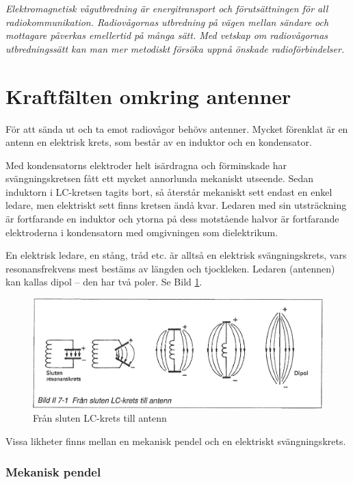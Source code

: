 \emph{Elektromagnetisk vågutbredning är energitransport och
  förutsättningen för all radiokommunikation. Radiovågornas utbredning
  på vägen mellan sändare och mottagare påverkas emellertid på många
  sätt. Med vetskap om radiovågornas utbredningssätt kan man mer
  metodiskt försöka uppnå önskade radioförbindelser.}

\section{Kraftfälten omkring antenner}

För att sända ut och ta emot radiovågor behövs antenner. Mycket
förenklat är en antenn en elektrisk krets, som består av en induktor
och en kondensator.

Med kondensatorns elektroder helt isärdragna och förminskade har
svängningskretsen fått ett mycket annorlunda mekaniskt utseende. Sedan
induktorn i LC-kretsen tagits bort, så återstår mekaniskt sett endast
en enkel ledare, men elektriskt sett finns kretsen ändå kvar. Ledaren
med sin utsträckning är fortfarande en induktor och ytorna på dess
motstående halvor är fortfarande elektroderna i kondensatorn med
omgivningen som dielektrikum.

En elektrisk ledare, en stång, tråd etc. är alltså en elektrisk
svängningskrets, vars resonansfrekvens mest bestäms av längden och
tjockleken. Ledaren (antennen) kan kallas dipol -- den har två
poler. Se Bild \ref{fig:BildII7-01}.

\begin{figure}
\includegraphics[width=\textwidth]{images/bild_2_7-01}
\caption{Från sluten LC-krets till antenn}
\label{fig:BildII7-01}
\end{figure}

Vissa likheter finns mellan en mekanisk pendel och en elektriskt
svängningskrets.

\subsubsection{Mekanisk pendel}


